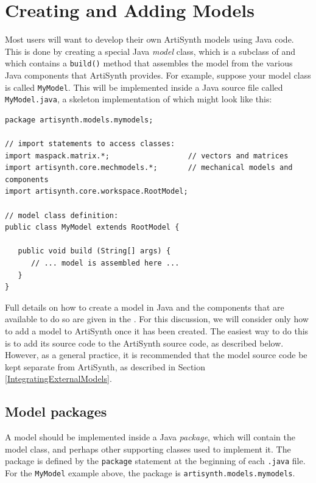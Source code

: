 \section{Creating and Adding Models}
\label{AddingModels}

Most users will want to develop their own ArtiSynth models using Java
code. This is done by creating a special Java {\it model} class, which
is a subclass of
 and which contains a
{\tt build()} method that assembles the model from the various Java
components that ArtiSynth provides. For example, suppose your model
class is called {\tt MyModel}. This will be implemented inside a Java
source file called {\tt MyModel.java}, a skeleton implementation of
which might look like this:
%
\begin{lstlisting}[]
package artisynth.models.mymodels;

// import statements to access classes:
import maspack.matrix.*;                  // vectors and matrices
import artisynth.core.mechmodels.*;       // mechanical models and components
import artisynth.core.workspace.RootModel;

// model class definition:
public class MyModel extends RootModel {

   public void build (String[] args) {
      // ... model is assembled here ...
   }
}
\end{lstlisting}
%
Full details on how to create a model in Java and the components that
are available to do so are given in
the\pdfbreak
{}. For this
discussion, we will consider only how to add a model to ArtiSynth once
it has been created. The easiest way to do this is to add its source
code to the ArtiSynth source code, as described below. However, as
a general practice, it is recommended that the model source code
be kept separate from ArtiSynth, as described in
Section \ref{IntegratingExternalModels}.

\subsection{Model packages}

A model should be implemented inside a Java {\it package}, which will
contain the model class, and perhaps other supporting classes used to
implement it. The package is defined by the {\tt package} statement at
the beginning of each {\tt .java} file. For the {\tt MyModel} example
above, the package is {\tt artisynth.models.mymodels}.

